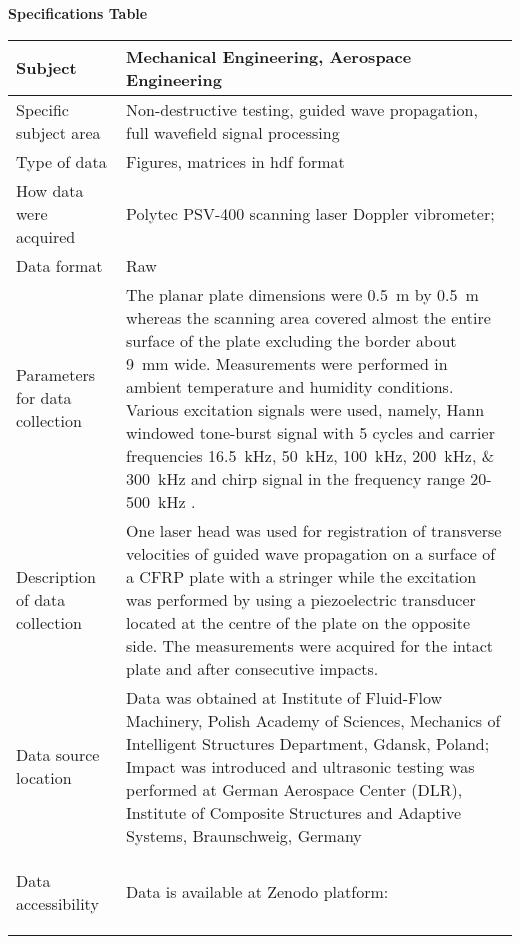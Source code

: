 \documentclass[times,final]{elsarticle}
\begin{document}
{\fontsize{7.5pt}{9pt}\selectfont
\noindent\textbf{Specifications Table} \\
 
\begin{longtable}{|p{33mm}|p{94mm}|}
\hline
\endhead
\hline
\endfoot
Subject                & Mechanical Engineering, Aerospace Engineering\\
\hline                         
Specific subject area  & Non-destructive testing, guided wave propagation, full wavefield signal processing\\
\hline
Type of data           &  Figures, matrices in hdf format
                         \\             
How data were acquired & Polytec PSV-400 scanning laser Doppler vibrometer; \\
\hline                         
Data format            & Raw
                         \\
\hline                         
Parameters for data\newline 
collection             & The planar plate dimensions were \SI{0.5}{\meter} by \SI{0.5}{\meter} whereas the scanning area covered almost the entire surface of the plate excluding the border about \SI{9}{\milli\meter} wide. Measurements were performed in ambient temperature and humidity conditions. Various excitation signals were used, namely, Hann windowed tone-burst signal with \num{5} cycles and carrier frequencies \SIlist{16.5;50;100;200;300}{\kilo\hertz} and chirp signal in the frequency range \num{20}-\SI{500}{\kilo\hertz} .\\  

\hline
Description of          
data\newline 
collection             & One laser head was used for registration of transverse velocities of guided wave propagation on a surface of a CFRP plate with a stringer while the excitation was performed by using a piezoelectric transducer located at the centre of the plate on the opposite side. The measurements were acquired for the intact plate and after consecutive impacts. \\
\hline                         
Data source location   & Data was obtained at Institute of Fluid-Flow Machinery, Polish Academy of Sciences, Mechanics of Intelligent Structures Department, Gdansk, Poland; Impact was introduced and ultrasonic testing was performed at German Aerospace Center (DLR), Institute of Composite Structures and Adaptive Systems, Braunschweig, Germany
 \\
\hline                         
\hypertarget{target1}
{Data accessibility}   & Data is available at Zenodo platform:  
    

\end{longtable}}
\end{document}
